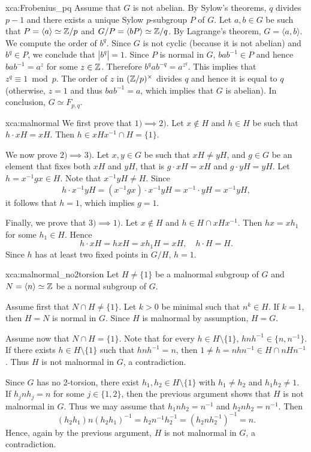 \begin{sol}{xca:Frobenius_pq}
    Assume that $G$ is not abelian. By Sylow's theorems, 
    $q$ divides $p-1$ and there exists 
    a unique Sylow $p$-subgroup $P$ of $G$. Let $a,b\in G$ be such that 
    $P=\langle a\rangle\simeq\mathbb{Z}/p$ and $G/P=\langle bP\rangle\simeq\mathbb{Z}/q$. By Lagrange's theorem, 
    $G=\langle a,b\rangle$. We compute the order of $b^q$. Since 
    $G$ is not cyclic (because it is not abelian) and $b^q\in P$, 
    we conclude that $|b^q|=1$. 
    Since $P$ is normal in $G$, 
    $bab^{-1}\in P$ and hence $bab^{-1}=a^z$ for some $z\in\mathbb{Z}$. Therefore
    $b^qab^{-q}=a^{z^q}$. This implies that 
    $z^q\equiv1\bmod p$. The order of $z$ in $(\mathbb{Z}/p)^{\times}$ divides 
    $q$ and hence it is equal to $q$ (otherwise, $z=1$ and thus $bab^{-1}=a$, which implies
    that $G$ is abelian). In conclusion, 
    $G\simeq F_{p,q}$. 
\end{sol}

\begin{sol}{xca:malnormal}
    We first prove that $1)\implies2)$. Let $x\not\in H$ and 
    $h\in H$ be such that $h\cdot xH=xH$. Then 
    $h\in xHx^{-1}\cap H=\{1\}$. 

    We now prove $2)\implies3)$. Let $x,y\in G$ be such that 
    $xH\ne yH$, and $g\in G$ be an element 
    that fixes both $xH$ and $yH$, that is 
    $g\cdot xH=xH$ and $g\cdot yH=yH$. Let  
    $h=x^{-1}gx\in H$. Note that 
    $x^{-1}yH\ne H$. Since 
    \[
    h\cdot x^{-1}yH=(x^{-1}gx)\cdot x^{-1}yH=x^{-1}\cdot yH=x^{-1}yH, 
    \]
    it follows that $h=1$, which implies $g=1$. 

    Finally, we prove that $3)\implies1)$. Let $x\not\in H$ and $h\in H\cap xHx^{-1}$. Then 
    $hx=xh_1$ for some $h_1\in H$. Hence
    \[
    h\cdot xH=hxH=xh_1H=xH,\quad 
    h\cdot H=H.
    \]
    Since $h$ has at least two fixed points
    in $G/H$, $h=1$. 
\end{sol}

\begin{sol}{xca:malnormal_no2torsion}
    Let $H\ne\{1\}$ be a malnormal subgroup of $G$ and $N=\langle n\rangle\simeq\mathbb{Z}$ be a
    normal subgroup of $G$. 

    Assume first that $N\cap H\ne\{1\}$. Let $k>0$ be minimal such that $n^k\in H$. If $k=1$, then
    $H=N$ is normal in $G$. Since $H$ is malnormal by assumption, $H=G$. 
    
    Assume now that $N\cap H=\{1\}$. Note that
    for every $h\in H\setminus\{1\}$, 
    $hnh^{-1}\in\{n,n^{-1}\}$. 
    If there exists 
    $h\in H\setminus\{1\}$ such that $hnh^{-1}=n$, then
    $1\ne h=nhn^{-1}\in H\cap nHn^{-1}$. Thus $H$ is not malnormal in $G$, a contradiction. 

    Since $G$ has no 2-torsion, there exist 
    $h_1,h_2\in H\setminus\{1\}$ with $h_1\ne h_2$ and 
    $h_1h_2\ne 1$. If $h_jnh_j=n$ for some $j\in\{1,2\}$, 
    then the previous argument shows that 
    $H$ is not malnormal in $G$. Thus we may assume that  $h_1nh_2=n^{-1}$ and 
    $h_2nh_2=n^{-1}$. Then 
    \[
    (h_2h_1)n(h_2h_1)^{-1}=h_2n^{-1}h_2^{-1}
    =(h_2nh_2^{-1})^{-1}=n.
    \]
    Hence, again by the previous argument, 
    $H$ is not malnormal in $G$, a contradiction.  
\end{sol}


